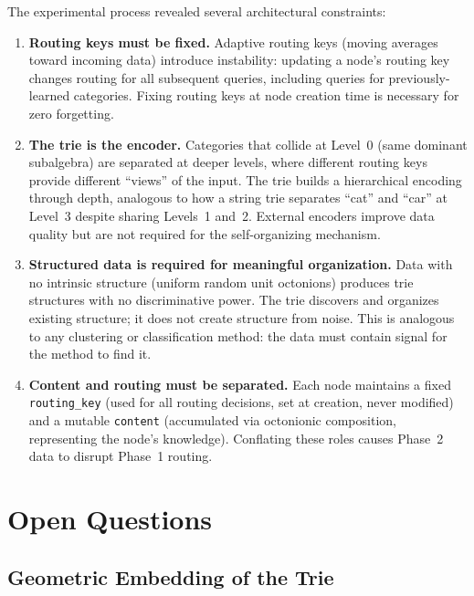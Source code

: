 \documentclass[11pt,a4paper]{article}
\theoremstyle{definition}
\theoremstyle{remark}
\begin{document}
The experimental process revealed several architectural constraints:

\begin{enumerate}[nosep]
  \item \textbf{Routing keys must be fixed.} Adaptive routing keys (moving averages toward incoming data) introduce instability: updating a node's routing key changes routing for all subsequent queries, including queries for previously-learned categories. Fixing routing keys at node creation time is necessary for zero forgetting.

  \item \textbf{The trie is the encoder.} Categories that collide at Level~0 (same dominant subalgebra) are separated at deeper levels, where different routing keys provide different ``views'' of the input. The trie builds a hierarchical encoding through depth, analogous to how a string trie separates ``cat'' and ``car'' at Level~3 despite sharing Levels~1 and~2. External encoders improve data quality but are not required for the self-organizing mechanism.

  \item \textbf{Structured data is required for meaningful organization.} Data with no intrinsic structure (uniform random unit octonions) produces trie structures with no discriminative power. The trie discovers and organizes existing structure; it does not create structure from noise. This is analogous to any clustering or classification method: the data must contain signal for the method to find it.

  \item \textbf{Content and routing must be separated.} Each node maintains a fixed \texttt{routing\_key} (used for all routing decisions, set at creation, never modified) and a mutable \texttt{content} (accumulated via octonionic composition, representing the node's knowledge). Conflating these roles causes Phase~2 data to disrupt Phase~1 routing.
\end{enumerate}

\section{Open Questions}
\label{sec:open}

\subsection{Geometric Embedding of the Trie}
\end{document}
